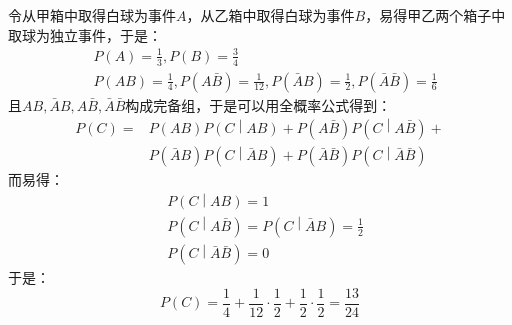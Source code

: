 令从甲箱中取得白球为事件$A$，从乙箱中取得白球为事件$B$，易得甲乙两个箱子中取球为独立事件，于是：
\begin{align*}
&P\left( A \right) =\frac{1}{3},P\left( B \right) =\frac{3}{4} \\
&P\left( AB \right) =\frac{1}{4},P\left( A\bar{B} \right) =\frac{1}{12},P\left( \bar{A}B \right) =\frac{1}{2},P\left( \bar{A}\bar{B} \right) =\frac{1}{6}
\end{align*}
且$AB,\bar{A}B,A\bar{B},\bar{A}\bar{B}$构成完备组，于是可以用全概率公式得到：
\begin{align*}
P\left( C \right) =&P\left( AB \right) P\left( C \middle| AB \right) +P\left( A\bar{B} \right) P\left( C \middle| A\bar{B} \right) + \\
&P\left( \bar{A}B \right) P\left( C \middle| \bar{A}B \right) +P\left( \bar{A}\bar{B} \right) P\left( C \middle| \bar{A}\bar{B} \right)
\end{align*}
而易得：
\begin{align*}
&P\left( C \middle| AB \right) =1 \\
&P\left( C \middle| A\bar{B} \right) =P\left( C \middle| \bar{A}B \right) =\frac{1}{2} \\
&P\left( C \middle| \bar{A}\bar{B} \right) =0
\end{align*}
于是：
\[
P\left( C \right) =\frac{1}{4}+\frac{1}{12}\cdot \frac{1}{2}+\frac{1}{2}\cdot \frac{1}{2}=\frac{13}{24}
\]




